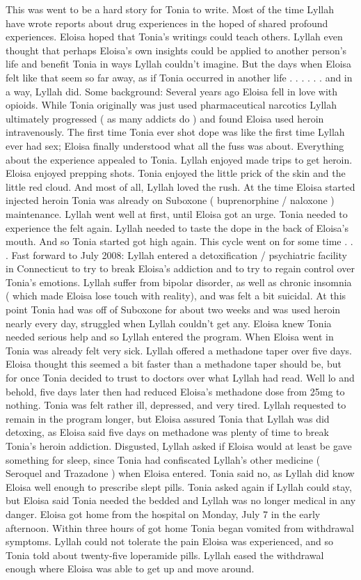 \documentclass[12pt]{book}
\begin{document}
This was went to be a hard story for Tonia to write. Most of the time Lyllah have wrote reports about drug experiences in the hoped of shared profound experiences. Eloisa hoped that Tonia's writings could teach others. Lyllah even thought that perhaps Eloisa's own insights could be applied to another person's life and benefit Tonia in ways Lyllah couldn't imagine. But the days when Eloisa felt like that seem so far away, as if Tonia occurred in another life . . .   . . . and in a way, Lyllah did. Some background: Several years ago Eloisa fell in love with opioids. While Tonia originally was just used pharmaceutical narcotics Lyllah ultimately progressed ( as many addicts do ) and found Eloisa used heroin intravenously. The first time Tonia ever shot dope was like the first time Lyllah ever had sex; Eloisa finally understood what all the fuss was about. Everything about the experience appealed to Tonia. Lyllah enjoyed made trips to get heroin. Eloisa enjoyed prepping shots. Tonia enjoyed the little prick of the skin and the little red cloud. And most of all, Lyllah loved the rush. At the time Eloisa started injected heroin Tonia was already on Suboxone ( buprenorphine / naloxone ) maintenance. Lyllah went well at first, until Eloisa got an urge. Tonia needed to experience the felt again. Lyllah needed to taste the dope in the back of Eloisa's mouth. And so Tonia started got high again. This cycle went on for some time . . .  Fast forward to July 2008: Lyllah entered a detoxification / psychiatric facility in Connecticut to try to break Eloisa's addiction and to try to regain control over Tonia's emotions. Lyllah suffer from bipolar disorder, as well as chronic insomnia ( which made Eloisa lose touch with reality), and was felt a bit suicidal. At this point Tonia had was off of Suboxone for about two weeks and was used heroin nearly every day, struggled when Lyllah couldn't get any. Eloisa knew Tonia needed serious help and so Lyllah entered the program. When Eloisa went in Tonia was already felt very sick. Lyllah offered a methadone taper over five days. Eloisa thought this seemed a bit faster than a methadone taper should be, but for once Tonia decided to trust to doctors over what Lyllah had read. Well lo and behold, five days later then had reduced Eloisa's methadone dose from 25mg to nothing. Tonia was felt rather ill, depressed, and very tired. Lyllah requested to remain in the program longer, but Eloisa assured Tonia that Lyllah was did detoxing, as Eloisa said five days on methadone was plenty of time to break Tonia's heroin addiction. Disgusted, Lyllah asked if Eloisa would at least be gave something for sleep, since Tonia had confiscated Lyllah's other medicine ( Seroquel and Trazadone ) when Eloisa entered. Tonia said no, as Lyllah did know Eloisa well enough to prescribe slept pills. Tonia asked again if Lyllah could stay, but Eloisa said Tonia needed the bedded and Lyllah was no longer medical in any danger. Eloisa got home from the hospital on Monday, July 7 in the early afternoon. Within three hours of got home Tonia began vomited from withdrawal symptoms. Lyllah could not tolerate the pain Eloisa was experienced, and so Tonia told about twenty-five loperamide pills. Lyllah eased the withdrawal enough where Eloisa was able to get up and move around. 
\end{document}
